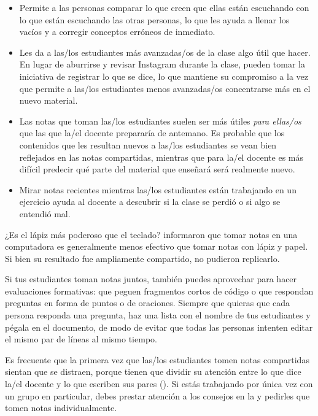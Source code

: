 \begin{itemize}

\item
  Permite a las personas comparar lo que creen que ellas están escuchando
  con lo que están escuchando las otras personas,
  lo que les ayuda a llenar los vacíos y a corregir conceptos erróneos de inmediato.
 
\item
  Les da a las/los estudiantes más avanzadas/os de la clase algo útil que hacer.
  En lugar de aburrirse y revisar Instagram durante la clase,
  pueden tomar la iniciativa de registrar lo que se dice,
  lo que mantiene su compromiso a la vez que
  permite a las/los estudiantes menos avanzadas/os concentrarse más en el nuevo material.
 
\item
  Las notas que toman las/los estudiantes suelen ser más útiles \emph{para ellas/os}
  que las que la/el docente prepararía de antemano.
  Es probable que los contenidos que les resultan nuevos a las/los estudiantes
  se vean bien reflejados en las notas compartidas,
  mientras que para la/el docente es más difícil predecir qué parte del material
  que enseñará será realmente nuevo.
  
\item
  Mirar notas recientes mientras las/los estudiantes están trabajando en un ejercicio
  ayuda al docente a descubrir si la clase se perdió o si algo se entendió mal.
 
\end{itemize}

\begin{aside}{¿Es el lápiz más poderoso que el teclado?}
  \cite{Muel2014} informaron que tomar notas en una computadora
  es generalmente menos efectivo que tomar notas con lápiz y papel.
  Si bien su resultado fue ampliamente compartido,
  \cite{More2019} no pudieron replicarlo.
\end{aside}

Si tus estudiantes toman notas juntos,
también puedes aprovechar para hacer evaluaciones formativas:
que peguen fragmentos cortos de código o
que respondan preguntas en forma de puntos o de oraciones.
Siempre que quieras que cada persona responda una pregunta,
haz una lista con el nombre de tus estudiantes y pégala en el documento,
de modo de evitar que todas las personas intenten editar el mismo par de líneas al mismo tiempo.

Es frecuente que la primera vez que las/los estudiantes tomen notas compartidas 
sientan que se distraen, porque tienen que dividir su atención entre
lo que dice la/el docente
y lo que escriben sus pares ().
Si estás trabajando por única vez con un grupo en particular,
debes prestar atención a los consejos en la 
y pedirles que tomen notas individualmente.

